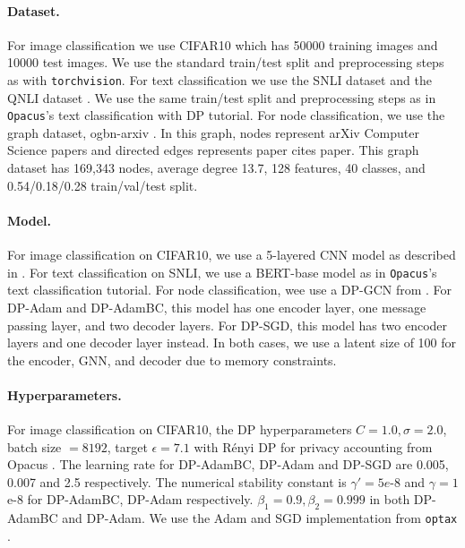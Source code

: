 \documentclass[letterpaper]{article} %
\begin{document}
\paragraph{Dataset.}
For image classification we use CIFAR10 \citep{cifar10_data} which has 50000 training images and 10000 test images. We use the standard train/test split and preprocessing steps as with \texttt{torchvision}.
For text classification we use the SNLI dataset \citep{bowman-etal-2015-large} and the QNLI dataset \citep{wang2019glue}. We use the same train/test split and preprocessing steps as in \texttt{Opacus}'s text classification with DP tutorial.
For node classification, we use the graph dataset, ogbn-arxiv \citep{hu2021open}. In this graph, nodes represent arXiv Computer Science papers and directed edges represents paper cites paper. This graph dataset has 169,343 nodes, average degree 13.7, 128 features, 40 classes, and 0.54/0.18/0.28 train/val/test split.

\paragraph{Model.}
For image classification on CIFAR10, we use a 5-layered CNN model as described in \citep{papernot2020tempered}.
For text classification on SNLI, we use a BERT-base model \citep{bert_paper} as in \texttt{Opacus}'s text classification tutorial.
For node classification, wee use a DP-GCN from \citet{daigavane2022nodelevel}. For DP-Adam and DP-AdamBC, this model has one encoder layer, one message passing layer, and two decoder layers. For DP-SGD, this model has two encoder layers and one decoder layer instead. In both cases, we use a latent size of 100 for the encoder, GNN, and decoder due to memory constraints.

\paragraph{Hyperparameters.}
For image classification on CIFAR10, the DP hyperparameters $C=1.0, \sigma=2.0$, batch size $=8192$, target $\epsilon = 7.1$ with R\'enyi DP for privacy accounting from Opacus \citep{opacus}. The learning rate for DP-AdamBC, DP-Adam and DP-SGD are 0.005, 0.007 and 2.5 respectively. The numerical stability constant is $\gamma'=5e$-8 and $\gamma=1$e-8 for DP-AdamBC, DP-Adam respectively. $\beta_1=0.9, \beta_2=0.999$ in both DP-AdamBC and DP-Adam. We use the Adam and SGD implementation from \texttt{optax} \citep{deepmind2020jax}.
\end{document}

